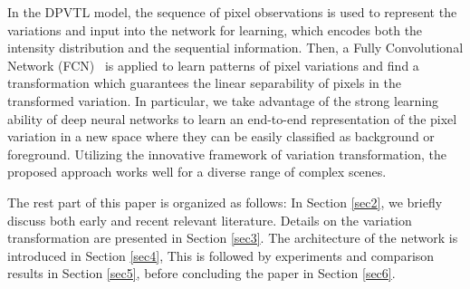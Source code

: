 \documentclass[journal]{IEEEtran}
\newcommand{\refsec}[1]{Section \ref{#1}}
\begin{document}
In the DPVTL model, 
the sequence of pixel observations is used to represent the variations and input into the network for learning,
which encodes both the intensity distribution and the sequential information.
%
Then, a Fully Convolutional Network (FCN)\ \cite{Shelhamer2017fcn} is applied to learn patterns of pixel variations and find a transformation which guarantees the linear separability of pixels in the transformed variation.
%
In particular,
we take advantage of the strong learning ability of deep neural networks to learn an end-to-end representation of the pixel variation in a new space where they can be easily classified as background or foreground.
%
Utilizing the innovative framework of variation transformation,
the proposed approach works well for a diverse range of complex scenes.
%
% 
% 
% 
% 

The rest part of this paper is organized as follows: In \refsec{sec2}, we briefly discuss both early and recent relevant literature. 
%
Details on the variation transformation are presented in \refsec{sec3}. The architecture of the network is introduced in \refsec{sec4}, This is followed by experiments and comparison results in \refsec{sec5}, before concluding the paper in \refsec{sec6}. 
\end{document}
